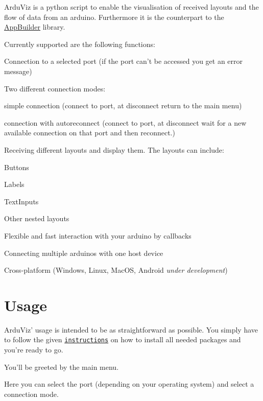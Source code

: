 Ardu\+Viz is a python script to enable the visualisation of received layouts and the flow of data from an arduino. Furthermore it is the counterpart to the \hyperlink{class_app_builder}{App\+Builder} library.

Currently supported are the following functions\+:
\begin{DoxyItemize}
\item Connection to a selected port (if the port can't be accessed you get an error message)
\item Two different connection modes\+:
\begin{DoxyItemize}
\item simple connection (connect to port, at disconnect return to the main menu)
\item connection with autoreconnect (connect to port, at disconnect wait for a new available connection on that port and then reconnect.)
\end{DoxyItemize}
\item Receiving different layouts and display them. The layouts can include\+:
\begin{DoxyItemize}
\item Buttons
\item Labels
\item Text\+Inputs
\item Other nested layouts
\end{DoxyItemize}
\item Flexible and fast interaction with your arduino by callbacks
\item Connecting multiple arduinos with one host device
\item Cross-\/platform (Windows, Linux, Mac\+O\+S, Android {\itshape under development})
\end{DoxyItemize}

\section*{Usage}

Ardu\+Viz' usage is intended to be as straightforward as possible. You simply have to follow the given \href{md_documentation_installation.html}{\tt instructions} on how to install all needed packages and you're ready to go.

You'll be greeted by the main menu.

 Here you can select the port (depending on your operating system) and select a connection mode.


